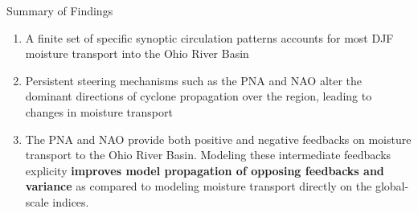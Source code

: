 \begin{block}{Summary of Findings}
    \begin{enumerate}
        \item A finite set of specific synoptic circulation patterns accounts for most DJF moisture transport into the Ohio River Basin
        \item Persistent steering mechanisms such as the PNA and NAO alter the dominant directions of cyclone propagation over the region, leading to changes in moisture transport
        \item The PNA and NAO provide both positive and negative feedbacks on moisture transport to the Ohio River Basin. Modeling these intermediate feedbacks explicity \textbf{improves model propagation of opposing feedbacks and variance} as compared to modeling moisture transport directly on the global-scale indices.
    \end{enumerate}
\end{block}
